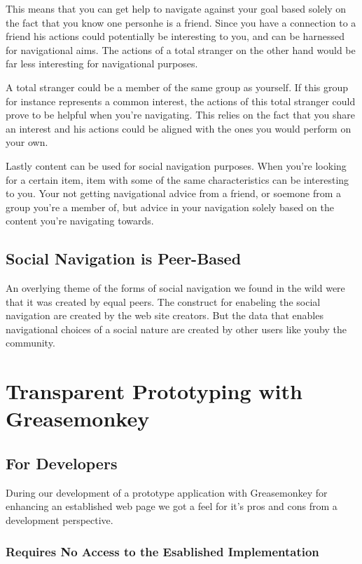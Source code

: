 This means that you can get help to navigate against your goal based solely
on the fact that you know one person\dash{}he is a friend. Since you have a
connection to a friend his actions could potentially be interesting to you,
and can be harnessed for navigational aims. The actions of a total stranger
on the other hand would be far less interesting for navigational purposes.

A total stranger could be a member of the same group as yourself. If this
group for instance represents a common interest, the actions of this total
stranger could prove to be helpful when you're navigating. This relies on the
fact that you share an interest and his actions could be aligned with
the ones you would perform on your own.

Lastly content can be used for social navigation purposes. When you're looking
for a certain item, item with some of the same characteristics can be
interesting to you. Your not getting navigational advice from a friend, or
soemone from a group you're a member of, but advice in your navigation solely
based on the content you're navigating towards.

\subsection{Social Navigation is Peer-Based}

An overlying theme of the forms of social navigation we found in the wild were
that it was created by equal peers. The construct for enabeling the social
navigation are created by the web site creators. But the data that
enables navigational choices of a social nature are created by other users
like you\dash{}by the community.

\section{Transparent Prototyping with Greasemonkey}

\subsection{For Developers}

During our development of a prototype application with Greasemonkey for
enhancing an established web page we got a feel for it's pros and cons from a
development perspective.

\subsubsection{Requires No Access to the Esablished Implementation}


